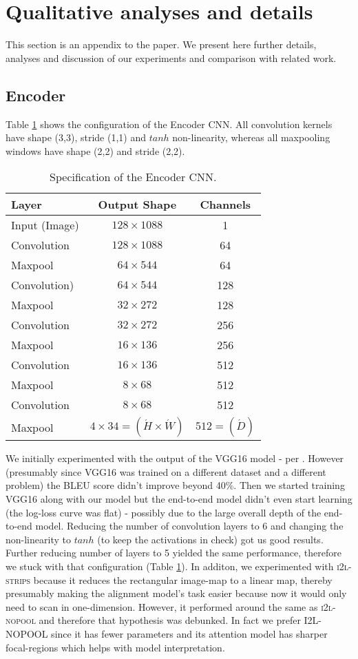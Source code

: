 \documentclass{article}
\begin{document}
\section{Qualitative analyses and details}
\label{observations}
This section is an appendix to the paper. We present here further details, analyses and discussion of our experiments and comparison with related work.

\subsection{Encoder}
\label{encoder-commentary}
Table \ref{table-cnn} shows the configuration of the Encoder CNN. All convolution kernels have shape (3,3), stride (1,1) and $tanh$ non-linearity, whereas all maxpooling windows have shape (2,2) and stride (2,2).
\begin{table}[!hbtp]
	\caption{Specification of the Encoder CNN.}
	\begin{tabular}{lcc}
		\hline
		{Layer} & Output Shape & {Channels} \\
		\hline
		Input (Image) & $128 \times 1088$ & 1\\
		Convolution & $128 \times 1088$ & 64 \\
		Maxpool & $64 \times 544$ & 64 \\
		Convolution) & $64 \times 544$ & 128 \\
		Maxpool & $32 \times 272$ & 128 \\
		Convolution & $32 \times 272$ & 256 \\
		Maxpool & $16 \times 136$ & 256 \\
		Convolution & $16 \times 136$ & 512 \\
		Maxpool & $8 \times 68$ & 512 \\
		Convolution & $8 \times 68$ & 512 \\
		Maxpool & $4 \times 34 = (\acute{H} \times \acute{W})$ & $512 = (\acute{D})$ 
	\end{tabular}
	\centering
	\label{table-cnn}
\end{table}
We initially experimented with the output of the VGG16 model \cite{Simonyan2014VeryDC} - per \citet{Xu2015ShowAA}. However (presumably since VGG16 was trained on a different dataset and a different problem) the BLEU score didn't improve beyond 40\%. Then we started training VGG16 along with our model but the end-to-end model didn't even start learning (the log-loss curve was flat) - possibly due to the large overall depth of the end-to-end model. Reducing the number of convolution layers to 6 and changing the non-linearity to $tanh$ (to keep the activations in check) got us good results. Further reducing number of layers to 5 yielded the same performance, therefore we stuck with that configuration (Table \ref{table-cnn}). In additon, we experimented with \textsc{i2l-strips} because it reduces the rectangular image-map to a linear map, thereby presumably making the alignment model's task easier because now it would only need to scan in one-dimension. However, it performed around the same as \textsc{i2l-nopool} and therefore that hypothesis was debunked. In fact we prefer I2L-NOPOOL since it has fewer parameters and its attention model has sharper focal-regions which helps with model interpretation.
\end{document}
